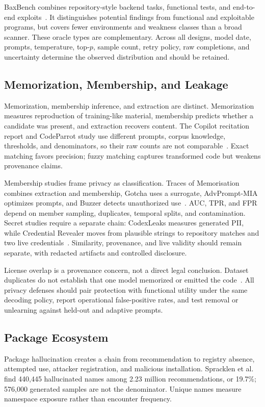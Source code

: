 \documentclass[acmsmall,screen,review]{acmart}
\begin{document}
BaxBench combines repository-style backend tasks, functional tests, and end-to-end exploits~\cite{baxbench2025}. It distinguishes potential findings from functional and exploitable programs, but covers fewer environments and weakness classes than a broad scanner. These oracle types are complementary. Across all designs, model date, prompts, temperature, top-$p$, sample count, retry policy, raw completions, and uncertainty determine the observed distribution and should be retained.

\subsection{Memorization, Membership, and Leakage} \label{sec:gensec:privacy}
Memorization, membership inference, and extraction are distinct. Memorization measures reproduction of training-like material, membership predicts whether a candidate was present, and extraction recovers content. The Copilot recitation report and CodeParrot study use different prompts, corpus knowledge, thresholds, and denominators, so their raw counts are not comparable~\cite{ziegler2021recitation,yang2024unveiling}. Exact matching favors precision; fuzzy matching captures transformed code but weakens provenance claims.

Membership studies frame privacy as classification. Traces of Memorisation combines extraction and membership, Gotcha uses a surrogate, AdvPrompt-MIA optimizes prompts, and Buzzer detects unauthorized use~\cite{alkaswan2024traces,yang2024gotcha,advprompt2025mia,zhang2023buzzer}. AUC, TPR, and FPR depend on member sampling, duplicates, temporal splits, and contamination. Secret studies require a separate chain: CodexLeaks measures generated PII, while Credential Revealer moves from plausible strings to repository matches and two live credentials~\cite{niu2023codexleaks,huang2024secret}. Similarity, provenance, and live validity should remain separate, with redacted artifacts and controlled disclosure.

License overlap is a provenance concern, not a direct legal conclusion. Dataset duplicates do not establish that one model memorized or emitted the code~\cite{katzy2024license}. All privacy defenses should pair protection with functional utility under the same decoding policy, report operational false-positive rates, and test removal or unlearning against held-out and adaptive prompts.

\subsection{Package Ecosystem}
Package hallucination creates a chain from recommendation to registry absence, attempted use, attacker registration, and malicious installation. Spracklen et al.~\cite{spracklen2025package} find 440{,}445 hallucinated names among 2.23 million recommendations, or 19.7\%; 576{,}000 generated samples are not the denominator. Unique names measure namespace exposure rather than encounter frequency.
\end{document}
